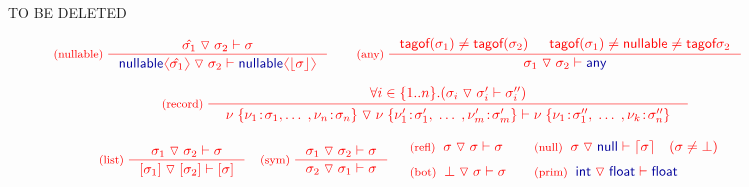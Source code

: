 \documentclass[10pt,preprint,clearpagebib]{sigplanconf}
\newcommand{\langl}{\begin{picture}(4.5,7)
\put(1.1,2.5){\rotatebox{60}{\line(1,0){5.5}}}
\put(1.1,2.5){\rotatebox{300}{\line(1,0){5.5}}}
\end{picture}}
\newcommand{\rangl}{\begin{picture}(4.5,7)
\put(.9,2.5){\rotatebox{120}{\line(1,0){5.5}}}
\put(.9,2.5){\rotatebox{240}{\line(1,0){5.5}}}
\end{picture}}
\newcommand{\kvd}[1]{\textnormal{\textcolor{kvdclr}{\sffamily #1}}}
\newcommand{\ident}[1]{\textnormal{\sffamily #1}}
\newcommand{\tsep}[0]{\; \triangledown \;}
\newcommand{\dropopt}[1]{\lfloor#1\rfloor}
\newcommand{\addopt}[1]{\lceil#1\rceil}
\newcommand{\tytagof}{\ident{tagof}}
\begin{document}
\begin{figure}[t]
{\color{red} TO BE DELETED}

\vspace{-0.5em}
\begin{equation*}
\color{red}
\inference[(nullable)\;]
  {\hat{\sigma_1} \tsep \sigma_2 \vdash \sigma}
  {\kvd{nullable}\langl\hat{\sigma_1}\rangl \tsep \sigma_2 \vdash \kvd{nullable}\langl\dropopt{\sigma}\rangl}
\qquad
\inference[(any)\;]
  { \tytagof(\sigma_1) \neq \tytagof(\sigma_2) & \tytagof(\sigma_1) \neq \ident{nullable} \neq \tytagof{\sigma_2}}
  { \sigma_1 \tsep \sigma_2 \vdash \kvd{any} }  
\end{equation*}
\vspace{-2em}

\begin{equation*}
\color{red}
\hspace{4em}
\inference[(record)\;]
  { \forall i\in\{ 1 .. n \}.(\sigma_i \tsep \sigma'_i \vdash \sigma''_i) }
  { \begin{array}{l}
    \nu \; \{ \nu_1 \!:\! \sigma_1,  \ldots \;, \nu_n \!:\! \sigma_n \} \tsep
    \nu \; \{ \nu'_1 \!:\! \sigma'_1, \; \ldots \;, \nu'_m \!:\! \sigma'_m \} \vdash
    \nu \; \{ \nu_1 \!:\! \sigma''_1, \; \ldots \; , \nu_k \!:\! \sigma''_n \}
    \end{array} }
\end{equation*}
\vspace{-2em}

\begin{equation*}
\color{red}
\hspace{2em}
\inference[(list)\;]
  {\sigma_1 \tsep \sigma_2 \vdash \sigma}
  {[\sigma_1] \tsep [\sigma_2] \vdash [\sigma]}
\quad
\inference[(sym)\;]
  {\sigma_1 \tsep \sigma_2 \vdash \sigma}
  {\sigma_2 \tsep \sigma_1 \vdash \sigma}
%
\quad
\begin{array}{l}
 \textnormal{\footnotesize{(refl)}}\;\; \sigma \tsep \sigma \vdash \sigma\\[0.6em]
 \textnormal{\footnotesize{(bot)}}\;\; \bot \tsep \sigma \vdash \sigma
\end{array}
%
\quad
\begin{array}{l}
 \textnormal{\footnotesize{(null)}}\;\; \sigma \tsep \kvd{null} \vdash \addopt{\sigma} \quad (\sigma \neq \bot)\\[0.6em]
 \textnormal{\footnotesize{(prim)}}\;\; \kvd{int} \tsep \kvd{float} \vdash \kvd{float}
\end{array}
\end{equation*}


\end{figure}
\end{document}
